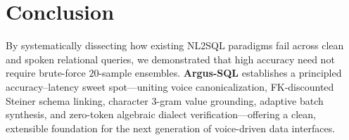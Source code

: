 \documentclass[10pt,twocolumn]{article}
\begin{document}
\section{Conclusion}

By systematically dissecting how existing NL2SQL paradigms fail across clean and spoken relational queries, we demonstrated that high accuracy need not require brute-force $20$-sample ensembles. \textbf{Argus-SQL} establishes a principled accuracy--latency sweet spot—uniting voice canonicalization, FK-discounted Steiner schema linking, character 3-gram value grounding, adaptive batch synthesis, and zero-token algebraic dialect verification—offering a clean, extensible foundation for the next generation of voice-driven data interfaces.

{\small
\let\oldthebibliography\thebibliography
\renewcommand{\thebibliography}[1]{%
  \oldthebibliography{#1}%
  \setlength{\itemsep}{2pt}%
  \setlength{\parskip}{0pt}%
}


}
\end{document}
